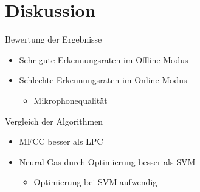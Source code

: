 \section{Diskussion}
\begin{frame}{Bewertung der Ergebnisse}
	\begin{itemize}[<+->]
		\item Sehr gute Erkennungsraten im Offline-Modus
		\item Schlechte Erkennungsraten im Online-Modus
		\begin{itemize}
			\item[\ding{229}] Mikrophonequalität
		\end{itemize}
	\end{itemize}
\end{frame}

\begin{frame}{Vergleich der Algorithmen}
	\begin{itemize}[<+->]
		\item MFCC besser als LPC
		\item Neural Gas durch Optimierung besser als SVM
		\begin{itemize}
			\item[\ding{229}] Optimierung bei SVM aufwendig
		\end{itemize}
	\end{itemize}
\end{frame}
